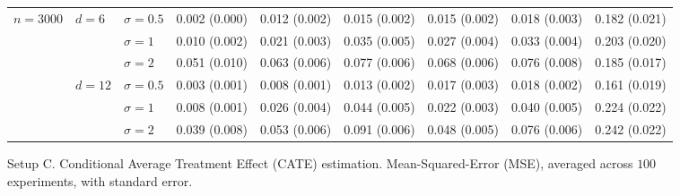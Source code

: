 \documentclass[11pt]{article} %
\theoremstyle{theorem}  %
\theoremstyle{plain}
\begin{document}
\begin{figure}[H]
\begin{tabular}{lllllllll}
\cline{1-9}
\cline{2-9}
\multirow{6}{*}{$n=3000$} & \multirow{3}{*}{$d=6$} & $\sigma=0.5$ &  0.002 (0.000) &  0.012 (0.002) &  0.015 (0.002) &  0.015 (0.002) &  0.018 (0.003) &  0.182 (0.021) \\
         &        & $\sigma=1$ &  0.010 (0.002) &  0.021 (0.003) &  0.035 (0.005) &  0.027 (0.004) &  0.033 (0.004) &  0.203 (0.020) \\
         &        & $\sigma=2$ &  0.051 (0.010) &  0.063 (0.006) &  0.077 (0.006) &  0.068 (0.006) &  0.076 (0.008) &  0.185 (0.017) \\
\cline{2-9}
         & \multirow{3}{*}{$d=12$} & $\sigma=0.5$ &  0.003 (0.001) &  0.008 (0.001) &  0.013 (0.002) &  0.017 (0.003) &  0.018 (0.002) &  0.161 (0.019) \\
         &        & $\sigma=1$ &  0.008 (0.001) &  0.026 (0.004) &  0.044 (0.005) &  0.022 (0.003) &  0.040 (0.005) &  0.224 (0.022) \\
         &        & $\sigma=2$ &  0.039 (0.008) &  0.053 (0.006) &  0.091 (0.006) &  0.048 (0.005) &  0.076 (0.006) &  0.242 (0.022) \\
\bottomrule
\end{tabular}

\caption{Setup C. Conditional Average Treatment Effect (CATE) estimation. Mean-Squared-Error (MSE), averaged across $100$ experiments, with standard error.}
\label{fig:setupC-cate}
\end{figure}
 
\end{document}
